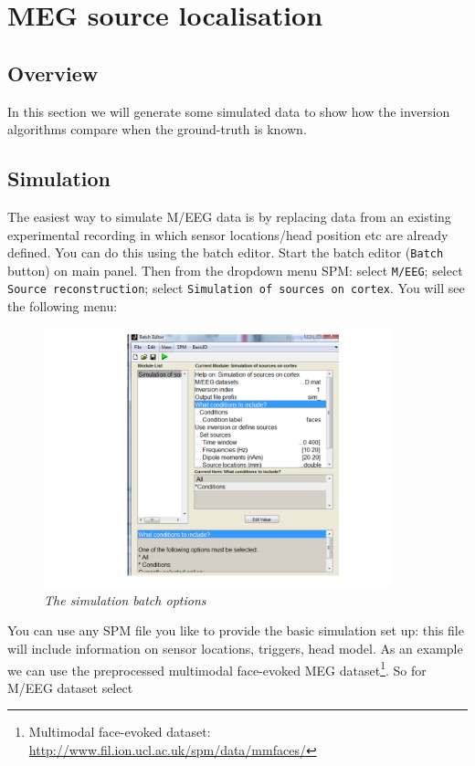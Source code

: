 \chapter{MEG source localisation\label{Chap:data:sloc}}


\section{Overview}
In this section we will generate some simulated data to show how the inversion algorithms compare when the ground-truth is known. 

\section{Simulation}
The easiest way to simulate M/EEG data is by replacing data from an existing experimental recording in which sensor locations/head position etc are already defined. You can do this using the batch editor. Start the batch editor (\texttt{Batch} button) on main panel. Then from the dropdown menu SPM: select \texttt{M/EEG}; select \texttt{Source reconstruction}; select \texttt{Simulation of sources on cortex}.
You will see the following menu:

\begin{figure}
\begin{center}
\includegraphics[width=100mm]{meg_sloc/slide1}
\caption{\em The simulation batch options} \label{meg_sloc:fig:1}
\end{center}
\end{figure}

You can use any SPM file you like to provide the basic simulation set up: this file will include information on sensor locations, triggers, head model. As an example we can use the preprocessed multimodal face-evoked MEG dataset\footnote{Multimodal face-evoked dataset: \url{http://www.fil.ion.ucl.ac.uk/spm/data/mmfaces/}}. So for M/EEG dataset select 


